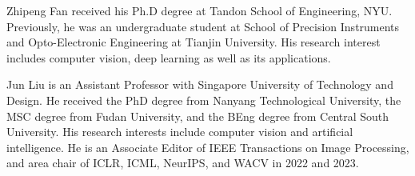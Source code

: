 \documentclass[lettersize,journal]{IEEEtran}
\begin{document}
\begin{IEEEbiography}{Zhipeng Fan} received his Ph.D degree at Tandon School of Engineering, NYU. Previously, he was an undergraduate student at School of Precision Instruments and Opto-Electronic Engineering at Tianjin University. His research interest includes computer vision, deep learning as well as its applications.
\end{IEEEbiography}

\begin{IEEEbiography}{Jun Liu} is an Assistant Professor with Singapore University of Technology and Design. He received the PhD degree from Nanyang Technological University, the MSC degree from Fudan University, and the BEng degree from Central South University. His research interests include computer vision and artificial intelligence. He is an Associate Editor of IEEE Transactions on Image Processing, and area chair of ICLR, ICML, NeurIPS, and WACV in 2022 and 2023.\end{IEEEbiography}
\end{document}
